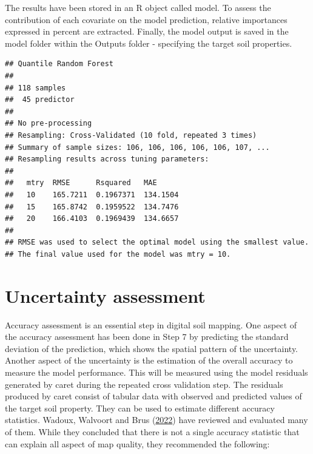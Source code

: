 \documentclass[
  10pt,
  b5paper,
  oneside]{book}
\newenvironment{Shaded}{\begin{snugshade}}{\end{snugshade}}
\newcommand{\AttributeTok}[1]{\textcolor[rgb]{0.77,0.63,0.00}{#1}}
\newcommand{\DocumentationTok}[1]{\textcolor[rgb]{0.56,0.35,0.01}{\textbf{\textit{#1}}}}
\newcommand{\FunctionTok}[1]{\textcolor[rgb]{0.00,0.00,0.00}{#1}}
\newcommand{\NormalTok}[1]{#1}
\newcommand{\OtherTok}[1]{\textcolor[rgb]{0.56,0.35,0.01}{#1}}
\newcommand{\SpecialCharTok}[1]{\textcolor[rgb]{0.00,0.00,0.00}{#1}}
\newcommand{\StringTok}[1]{\textcolor[rgb]{0.31,0.60,0.02}{#1}}
\begin{document}
The results have been stored in an R object called model. To assess the contribution of each covariate on the model prediction, relative importances expressed in percent are extracted. Finally, the model output is saved in the model folder within the Outputs folder - specifying the target soil properties.

\begin{Shaded}
\end{Shaded}

\begin{verbatim}
## Quantile Random Forest 
## 
## 118 samples
##  45 predictor
## 
## No pre-processing
## Resampling: Cross-Validated (10 fold, repeated 3 times) 
## Summary of sample sizes: 106, 106, 106, 106, 106, 107, ... 
## Resampling results across tuning parameters:
## 
##   mtry  RMSE      Rsquared   MAE     
##   10    165.7211  0.1967371  134.1504
##   15    165.8742  0.1959522  134.7476
##   20    166.4103  0.1969439  134.6657
## 
## RMSE was used to select the optimal model using the smallest value.
## The final value used for the model was mtry = 10.
\end{verbatim}

\hypertarget{uncertainty-assessment}{%
\section{Uncertainty assessment}\label{uncertainty-assessment}}

Accuracy assessment is an essential step in digital soil mapping. One aspect of the accuracy assessment has been done in Step 7 by predicting the standard deviation of the prediction, which shows the spatial pattern of the uncertainty. Another aspect of the uncertainty is the estimation of the overall accuracy to measure the model performance. This will be measured using the model residuals generated by caret during the repeated cross validation step.
The residuals produced by caret consist of tabular data with observed and predicted values of the target soil property. They can be used to estimate different accuracy statistics. Wadoux, Walvoort and Brus (\protect\hyperlink{ref-Wadoux2022}{2022}) have reviewed and evaluated many of them. While they concluded that there is not a single accuracy statistic that can explain all aspect of map quality, they recommended the following:
\end{document}
